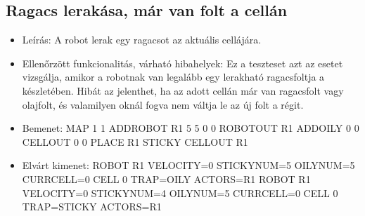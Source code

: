 \subsection{Ragacs lerakása, már van folt a cellán
	}
\begin{itemize}
	\item Leírás: \newline
A robot lerak egy ragacsot az aktuális cellájára.
	\item Ellenőrzött funkcionalitás, várható hibahelyek: \newline
Ez a teszteset azt az esetet vizsgálja, amikor a robotnak van legalább egy lerakható ragacsfoltja a készletében. Hibát az jelenthet, ha az adott cellán már van ragacsfolt vagy olajfolt, és valamilyen oknál fogva nem váltja le az új folt a régit.

	\item Bemenet: \newline
MAP 1 1 \newline
ADDROBOT R1 5 5 0 0	 \newline
ROBOTOUT R1 \newline
ADDOILY 0 0 \newline
CELLOUT 0 0 \newline
PLACE R1 STICKY  \newline
CELLOUT R1

	\item Elvárt kimenet: \newline
	ROBOT R1 VELOCITY=0 STICKYNUM=5 OILYNUM=5 CURRCELL=0 \newline
	CELL 0 TRAP=OILY ACTORS=R1 \newline
	ROBOT R1 VELOCITY=0 STICKYNUM=4 OILYNUM=5 CURRCELL=0 \newline
	CELL 0 TRAP=STICKY ACTORS=R1	
	
\end{itemize}


